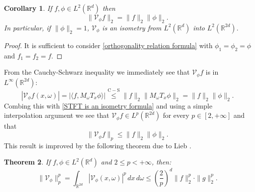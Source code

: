 \documentclass[corpo=11pt, stile=classica, tipotesi=custom,
greek, evenboxes, english]{toptesi}
\numberwithin{equation}{chapter}
\newtheorem{teo}{Theorem}[chapter] %
\newtheorem{cor}[teo]{Corollary}
\theoremstyle{definition}
\theoremstyle{remark}
\newcommand{\R}{\mathbb{R}} %
\newcommand{\V}{\mathcal{V}} %
\begin{document}
\begin{cor}
	If $f, \phi \in L^2(\R^d)$ then
	\begin{equation}\label{STFT is an isometry formula}
		\| \V_{\phi} f\|_2 = \| f \|_2 \| \phi \|_2.
	\end{equation} 
	In particular, if $\| \phi \|_2 = 1$, $\V_{\phi}$ is an isometry from $L^2(\R^d)$ into $L^2(\R^{2d})$.
\end{cor}
\begin{proof}
	It is sufficient to consider \eqref{orthogonality relation formula} with $\phi_1 = \phi_2 = \phi$ and $f_1 = f_2 = f$.
\end{proof}
From the Cauchy-Schwarz inequality we immediately see that $\V_{\phi} f$ is in $L^{\infty}(\R^{2d})$:
\begin{equation}\label{STFT is bounded}
	|\V_{\phi} f(x,\omega)| = |\langle f, M_{\omega} T_x \phi\rangle| \overset{\mathrm{C-S}}{\leq} \|f\|_2 \|M_{\omega}T_x \phi\|_2 = \|f\|_2 \|\phi\|_2.
\end{equation}
Combing this with \eqref{STFT is an isometry formula} and using a simple interpolation argument we see that $\V_{\phi}f \in L^p(\R^{2d})$ for every $p \in [2,+\infty]$ and that 
\begin{equation}\label{STFT is in L^p for p>=2}
	\|\V_{\phi}f\|_p \leq \|f\|_2 \|\phi\|_2.
\end{equation}
This result is improved by the following theorem due to Lieb \cite{lieb_integral}.
\begin{teo}\label{Lieb's inequality}
	If $f,\phi \in L^2(\R^d)$ and $2 \leq p < +\infty$, then:
	\begin{equation}\label{Lieb's inequality formula}
		\| \V_{\phi} \|_p^p = \int_{\R^{2d}} |\V_{\phi}(x,\omega)|^p \,dx\,d\omega \leq \left(\dfrac{2}{p}\right)^d \|f\|_2^p \cdot \|g\|_2^p.
	\end{equation}
\end{teo}
\end{document}
